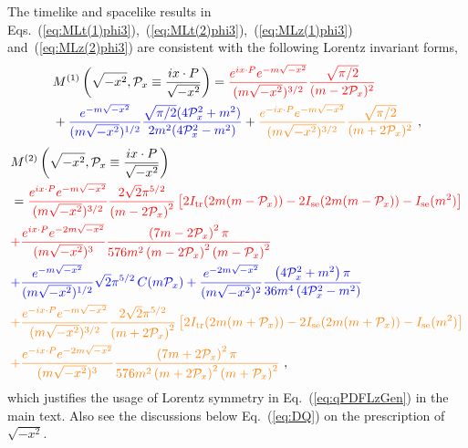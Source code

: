 \documentclass[a4paper,11pt]{article}
\begin{document}
The timelike and spacelike results in Eqs.~(\ref{eq:MLt(1)phi3}),~(\ref{eq:MLt(2)phi3}),~(\ref{eq:MLz(1)phi3}) and~(\ref{eq:MLz(2)phi3}) are consistent with the following Lorentz invariant forms,
\begin{align}\label{eq:MLx(1)phi3}
&M^{(1)}\left(\sqrt{-x^2}, \mathcal{P}_x \equiv \frac{i x \cdot P}{\sqrt{-x^2}} \right) = 
{\color{red} \frac{e^{i x \cdot P} e^{-m \sqrt{-x^2}}}{(m \sqrt{-x^2})^{3/2}} \frac{\sqrt{\pi/2}}{(m-2 \mathcal{P}_x)^2} } \nonumber\\
&+ {\color{blue} \frac{e^{-m \sqrt{-x^2}}}{(m \sqrt{-x^2})^{1/2}} \frac{\sqrt{\pi/2}(4 \mathcal{P}_x^2+m^2)}{2m^2(4\mathcal{P}_x^2-m^2)} } 
+ {\color{orange} \frac{e^{-i x \cdot P} e^{-m \sqrt{-x^2}}}{(m \sqrt{-x^2})^{3/2}} \frac{\sqrt{\pi/2}}{(m+2 \mathcal{P}_x)^2} } \ ,
\end{align}
\begin{align}\label{eq:MLx(2)phi3}
&M^{(2)}\left(\sqrt{-x^2}, \mathcal{P}_x \equiv \frac{i x \cdot P}{\sqrt{-x^2}} \right) \nonumber\\
&= {\color{red} \frac{e^{i x \cdot P} e^{-m \sqrt{-x^2}}}{(m \sqrt{-x^2})^{3/2}} \frac{2 \sqrt{2} \pi ^{5/2}}{\left(m-2 \mathcal{P}_x\right)^2} \left[ 2 I_{\rm tr}(2m(m-\mathcal{P}_x)) - 2 I_{\rm se}(2m(m-\mathcal{P}_x)) - I_{\rm se}(m^2) \right] } \nonumber\\
&{\color{red}+\frac{e^{i x \cdot P} e^{-2 m \sqrt{-x^2}}}{(m \sqrt{-x^2})^{3}} \frac{\left(7 m-2 \mathcal{P}_x\right)^2 \pi }{576 m^2 \left(m-2\mathcal{P}_x\right)^2 \left(m-\mathcal{P}_x\right)^2}}  \nonumber\\
&{\color{blue}+\frac{e^{-m \sqrt{-x^2}}}{(m \sqrt{-x^2})^{1/2}} \sqrt{2} \pi^{5/2} \, C(m \mathcal{P}_x) +\frac{e^{-2m \sqrt{-x^2}}}{(m \sqrt{-x^2})^{2}}\frac{\left(4 \mathcal{P}_x^2+m^2\right)\pi }{36 m^4 \left(4\mathcal{P}_x^2-m^2\right)} }  \nonumber\\
&{\color{orange}+\frac{e^{-i x \cdot P} e^{-m \sqrt{-x^2}}}{(m \sqrt{-x^2})^{3/2}} \frac{2 \sqrt{2} \pi ^{5/2}}{\left(m+2 \mathcal{P}_x\right)^2} \left[ 2 I_{\rm tr}(2m(m+\mathcal{P}_x)) - 2 I_{\rm se}(2m(m+\mathcal{P}_x)) - I_{\rm se}(m^2) \right] } \nonumber\\
&{\color{orange}+\frac{e^{-i x \cdot P} e^{-2 m \sqrt{-x^2}}}{(m \sqrt{-x^2})^{3}} \frac{\left(7 m+2 \mathcal{P}_x\right)^2 \pi }{576 m^2 \left(m+2\mathcal{P}_x\right)^2 \left(m+\mathcal{P}_x\right)^2}} \ ,
\end{align}
which justifies the usage of Lorentz symmetry in Eq.~(\ref{eq:qPDFLzGen}) in the main text. Also see the discussions below Eq.~(\ref{eq:DQ}) on the prescription of $\sqrt{-x^2}$. 
\end{document}
